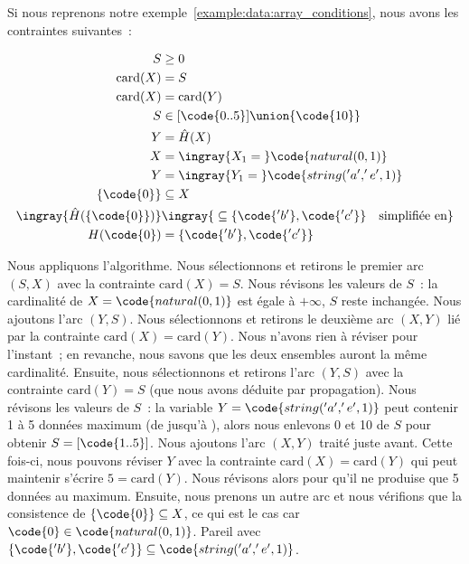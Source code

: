 \begin{example}

Si nous reprenons notre exemple~\ref{example:data:array_conditions}, nous avons
les contraintes suivantes~:

\begin{align*}
%
S & \geq 0 \\
%
\mathrm{card}(X) & = S \\
%
\mathrm{card}(X) & = \mathrm{card}(Y) \\
%
S & \in [\code{0..5}] \union \{\code{10}\} \\
%
Y & = \hat{H}(X) \\
%
X & = \ingray{X_1 =\;} \code{natural(0, 1)} \\
%
Y & = \ingray{Y_1 =\;} \code{string('a', 'e', 1)} \\
%
\{\code{0}\} & \subseteq X \\
%
\ingray{\hat{H}(\{\code{0}\})} & \ingray{\;\subseteq \{\code{'b'}, \code{'c'}\}
                                 \quad \text{simplifiée en}} \\
%
H(\code{0}) & = \{\code{'b'}, \code{'c'}\}
%
\end{align*}

Nous appliquons l'algorithme. Nous sélectionnons et retirons le premier arc $(S,
X)$ avec la contrainte $\mathrm{card}(X) = S$. Nous révisons les valeurs de
$S$~: la cardinalité de $X = \code{natural(0, 1)}$ est égale à $+\infty$, $S$
reste inchangée. Nous ajoutons l'arc $(Y, S)$. Nous sélectionnons et retirons le
deuxième arc $(X, Y)$ lié par la contrainte $\mathrm{card}(X) =
\mathrm{card}(Y)$. Nous n'avons rien à réviser pour l'instant~; en revanche,
nous savons que les deux ensembles auront la même cardinalité. Ensuite, nous
sélectionnons et retirons l'arc $(Y, S)$ avec la contrainte $\mathrm{card}(Y) =
S$ (que nous avons déduite par propagation). Nous révisons les valeurs de $S$~:
la variable $Y = \code{string('a', 'e', 1)}$ peut contenir 1 à 5 données maximum
(de  jusqu'à ), alors nous enlevons 0 et 10 de $S$ pour obtenir
$S = [\code{1..5}]$. Nous ajoutons l'arc $(X, Y)$ traité juste avant. Cette
fois-ci, nous pouvons réviser $Y$ avec la contrainte $\mathrm{card}(X) =
\mathrm{card}(Y)$ qui peut maintenir s'écrire $5 = \mathrm{card}(Y)$. Nous
révisons alors  pour qu'il ne produise que 5 données au
maximum. Ensuite, nous prenons un autre arc et nous vérifions que la consistence
de $\{\code{0}\} \subseteq X$, ce qui est le cas car $\code{0} \in
\code{natural(0, 1)}$. Pareil avec $\{\code{'b'}, \code{'c'}\} \subseteq
\code{string('a', 'e', 1)}$.

\end{example}

